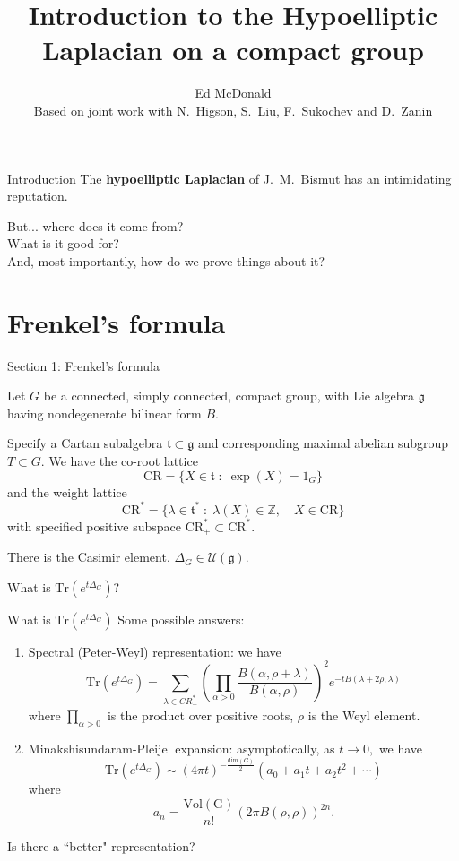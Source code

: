 \documentclass{beamer}
\newcommand\makebeamertitle{\frame{\maketitle}}%
\numberwithin{equation}{section}
\theoremstyle{plain}
\theoremstyle{plain}
\theoremstyle{definition}
\theoremstyle{plain}
\theoremstyle{plain}
\theoremstyle{definition}
\newcommand{\Itgr}{\mathbb{Z}}
\newcommand{\Uc}{\mathcal{U}}
\newcommand{\Tr}{\mathrm{Tr}}
\newcommand{\gf}{\mathfrak{g}}
\newcommand{\tf}{\mathfrak{t}}
\newcommand{\CR}{\mathrm{CR}}
\begin{document}
\title[Introduction to the Hypoelliptic Laplacian]{Introduction to the Hypoelliptic Laplacian on a compact group}


\author[E. McDonald]{Ed McDonald\\
Based on joint work with N.~Higson, S.~Liu, F.~Sukochev and D.~Zanin}



\makebeamertitle

\begin{frame}{Introduction}
  The \textbf{hypoelliptic Laplacian} of J.~M.~Bismut has an intimidating reputation.
  
  \pause
  But... where does it come from?\\
  \pause
  What is it good for?\\
  \pause
  And, most importantly, how do we prove things about it?
\end{frame}

\section{Frenkel's formula}

\begin{frame}
  \huge{Section 1: Frenkel's formula}
\end{frame}

\begin{frame}
  Let $G$ be a connected, simply connected, compact group, with Lie algebra $\gf$ having nondegenerate bilinear form $B.$
  
  Specify a Cartan subalgebra $\tf \subset \gf$ and corresponding maximal abelian subgroup $T\subset G.$
  We have the co-root lattice
  \[
    \CR = \{X \in \tf\;:\; \exp(X) = 1_G\}
  \]
  and the weight lattice 
  \[
  \CR^* = \{\lambda \in \tf^*\;:\; \lambda(X) \in \Itgr,\quad X \in \CR\}
  \]
  with specified positive subspace $\CR_+^*\subset \CR^*.$
  
  There is the Casimir element, $\Delta_G \in \Uc(\gf).$
   
  What is $\Tr(e^{t\Delta_G})$? 
\end{frame}

\begin{frame}{What is $\Tr(e^{t\Delta_G})$}
  Some possible answers:
  \begin{enumerate}
    \item{} Spectral (Peter-Weyl) representation: we have
    \[
        \Tr(e^{t\Delta_G}) = \sum_{\lambda\in CR^*_+} \left(\prod_{\alpha>0} \frac{B(\alpha,\rho+\lambda)}{B(\alpha,\rho)}\right)^2e^{-tB(\lambda+2\rho,\lambda)}
    \]
    where $\prod_{\alpha>0}$ is the product over positive roots, $\rho$ is the Weyl element.
    \item{} Minakshisundaram-Pleijel expansion: asymptotically, as $t\to 0,$ we have
    \[
        \Tr(e^{t\Delta_G}) \sim (4\pi t)^{-\frac{\mathrm{dim}(G)}{2}}(a_0+a_1t+a_2t^2+\cdots)
    \]
    where 
    \[
      a_n = \frac{\mathrm{Vol(G)}}{n!}(2\pi B(\rho,\rho))^{2n}.
    \]
  \end{enumerate}
  \pause
  Is there a ``better" representation?
\end{frame}
\end{document}
